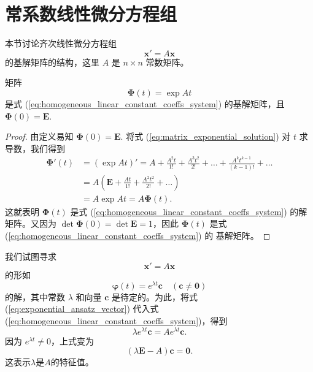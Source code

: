 \section{常系数线性微分方程组}\label{sec:常系数线性微分方程组}
本节讨论齐次线性微分方程组
\begin{equation}
\mathbf{x}'=A\mathbf{x} \label{eq:homogeneous_linear_constant_coeffs_system}
\end{equation}
的基解矩阵的结构，这里 $A$ 是 $n \times n$ 常数矩阵。

\begin{theorem}[常系数线性微分方程组的基解矩阵]\label{thm:matrix_exponential_fundamental_matrix}
    矩阵
\begin{equation}
\boldsymbol{\Phi}(t) = \exp At \label{eq:matrix_exponential_solution}
\end{equation}
是式 (\ref{eq:homogeneous_linear_constant_coeffs_system}) 的基解矩阵，且 $\boldsymbol{\Phi}(0)=\mathbf{E}$.

\end{theorem}

\begin{proof}
    由定义易知 $\boldsymbol{\Phi}(0)=\mathbf{E}$. 将式 (\ref{eq:matrix_exponential_solution}) 对 $t$ 求导数，我们得到
\begin{align*}
\boldsymbol{\Phi}'(t) &= (\exp At)' = A + \frac{A^2 t}{1!} + \frac{A^3 t^2}{2!} + \dots + \frac{A^k t^{k-1}}{(k-1)!} + \dots \\
&= A\left(\mathbf{E} + \frac{At}{1!} + \frac{A^2t^2}{2!} + \dots \right) \\
&= A\exp At = A\boldsymbol{\Phi}(t).
\end{align*}
这就表明 $\boldsymbol{\Phi}(t)$ 是式 (\ref{eq:homogeneous_linear_constant_coeffs_system}) 的解矩阵。又因为 $\det \boldsymbol{\Phi}(0)=\det \mathbf{E}=1$，因此 $\boldsymbol{\Phi}(t)$ 是式 (\ref{eq:homogeneous_linear_constant_coeffs_system}) 的
基解矩阵。
\end{proof}

我们试图寻求
$$\mathbf{x}'=A\mathbf{x}$$
的形如
\begin{equation}
\boldsymbol{\varphi}(t) = e^{\lambda t}\mathbf{c} \quad (\mathbf{c}\ne\mathbf{0}) \label{eq:exponential_ansatz_vector}
\end{equation}
的解，其中常数 $\lambda$ 和向量 $\mathbf{c}$ 是待定的。为此，将式 (\ref{eq:exponential_ansatz_vector}) 代入式 (\ref{eq:homogeneous_linear_constant_coeffs_system})，得到
$$\lambda e^{\lambda t}\mathbf{c}=A e^{\lambda t}\mathbf{c}.$$
因为 $e^{\lambda t} \ne 0$，上式变为
\begin{equation}
(\lambda \mathbf{E}-A)\mathbf{c}=\mathbf{0}. \label{eq:eigenvalue_eigenvector_equation}
\end{equation}
这表示$\lambda$是$A$的特征值。


